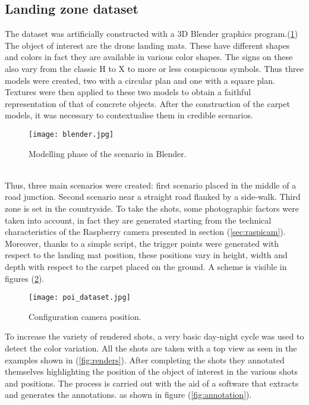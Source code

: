 \subsection{Landing zone dataset}
\label{ssec:landing-zone}
%
The dataset was artificially constructed with a 3D Blender graphics program.(\ref{fig:blender})\\ 
The object of interest are the drone landing mats. These have different shapes
and colors in fact they are available in various color shapes. The signs on
these also vary from the classic H to X to more or less conspicuous symbols.
Thus three models were created, two with a circular plan and one with a square
plan. 
Textures were then applied to these two models to obtain a faithful
representation of that of concrete objects. \hfill \break
After the construction of the carpet models, it was necessary to contextualise 
them in credible scenarios.\hfill \break
%
\begin{figure}[htb]
	\centering
	\texttt{[image: blender.jpg]}
	\caption{Modelling phase of the scenario in Blender.}
	\label{fig:blender}
\end{figure}
%
\\Thus, three main scenarios were created: first scenario placed in the middle of a road
junction. Second scenario near a straight road flanked by a side-walk.
Third zone is set in the countryside. To take the shots, some photographic
factors were taken into account, in fact they are generated starting from the
technical characteristics of the Raspberry camera presented in section
(\ref{sec:raspicam}). Moreover, thanks to a simple script, the trigger points
were generated with respect to the landing mat position, these positions vary in
height, width and depth with respect to the carpet placed on the ground.
A scheme is visible in figures (\ref{fig:poi_dataset}). \hfill \break
%
\begin{figure}[htb]
	\centering
	\texttt{[image: poi\_dataset.jpg]}
	\caption{Configuration camera position.}
	\label{fig:poi_dataset}
\end{figure}
%
\newpage
To increase the variety of rendered shots, a very basic day-night cycle was
used to detect the color variation. All the shots are taken with a top view as
seen in the examples shown in (\ref{fig:renders}).
After completing the shots they annotated themselves highlighting the position
of the object of interest in the various shots and positions.
The process is carried out with the aid of a software that extracts and
generates the annotations. as shown in figure (\ref{fig:annotation}).
